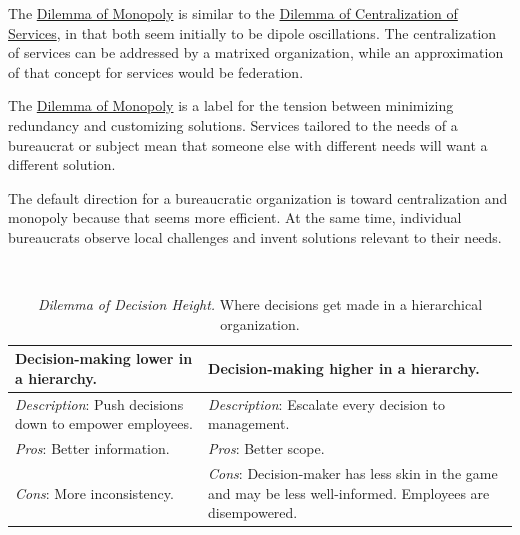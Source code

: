 The \hyperref[table:dilemma-org-market-vs-monopoly]{Dilemma of Monopoly} is similar to the \hyperref[table:dilemma-org-central-vs-distributed]{Dilemma of Centralization of Services}, in that both seem initially to be dipole oscillations. The centralization of services can be addressed by a matrixed organization, while an approximation of that concept for services would be federation. 

The \hyperref[table:dilemma-org-market-vs-monopoly]{Dilemma of Monopoly} is a label for the tension between minimizing redundancy and customizing solutions. Services tailored to the needs of a bureaucrat or subject mean that someone else with different needs will want a different solution. 


The default direction for a bureaucratic organization is toward centralization and monopoly because that seems more efficient. At the same time, individual bureaucrats observe local challenges and invent solutions relevant to their needs.


\ \\

\begin{center}
\begin{table}[H] %
\begin{tabular}{ | m{\dilemmatablewidth}| m{\dilemmatablewidth} | } 
  \hline
  \textbf{Decision-making lower in a hierarchy.} &
  \textbf{Decision-making higher in a hierarchy.} \\
  \hline
  \textit{Description}: Push decisions down to empower employees. &
  \textit{Description}: Escalate every decision to management. \\  
  \hline
  \textit{Pros}: Better information. &
  \textit{Pros}: Better scope. \\
  \hline
  \textit{Cons}: More inconsistency. & 
  \textit{Cons}: Decision-maker has less skin in the game and may be less well-informed. Employees are disempowered. \\
  \hline
\end{tabular}
\caption{
\textit{Dilemma of Decision Height.}
Where decisions get made in a hierarchical organization.
}
\label{table:dilemma-org-decisions-low-vs-high}
\end{table}
\end{center}

